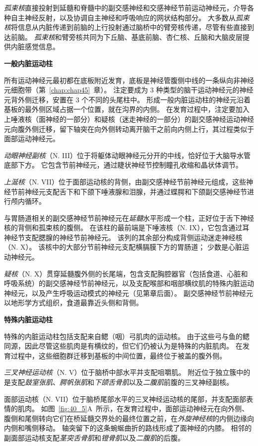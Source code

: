 \textit{孤束核}直接投射到延髓和脊髓中的副交感神经和交感神经节前运动神经元，介导各种自主神经反射，以及协调自主神经和呼吸响应的网状结构部分。
大多数从\textit{孤束核}将信息从内脏传递到前脑的上行投射通过脑桥中的臂旁核传递，尽管有些直接到达前脑。
\textit{孤束核}和臂旁核共同为下丘脑、基底前脑、杏仁核、丘脑和大脑皮层提供内脏感觉信息。


\textbf{一般内脏运动柱}

所有运动神经元最初都在底板附近发育，底板是神经管腹侧中线的一条纵向非神经元细胞带（第~\ref{chap:chap45}~章）。
注定要成为 3 种类型的脑干运动神经元的神经元背外侧迁移，安置在 3 个不同的头尾柱中。
形成一般内脏运动柱的神经元沿着基板的最外侧区域占据一个位置，就在沟界的内侧。
在发育过程中，注定要加入上唾液核（面神经的一部分）和疑核（迷走神经的一部分）的副交感神经运动神经元向腹外侧迁移，留下轴突在向外侧转动离开脑干之前向内侧上行，其过程类似于面部运动神经元。


\textit{动眼神经副核}（N. III）位于将躯体动眼神经元分开的中线，恰好位于大脑导水管底部下方。
它包含节前神经元，通过睫状神经节控制瞳孔收缩和晶状体调节。


\textit{上涎核}（N. VII）位于面部运动核的背侧，由副交感神经节前神经元组成，这些神经节前神经元支配舌下和下颌下唾液腺和泪腺，并通过蝶腭和下颌副交感神经节进行颅内循环。


与胃肠道相关的副交感神经节前神经元在\textit{延髓}水平形成一个柱，正好位于舌下神经核的背侧和孤束核的腹侧。
在该柱的最前端是下唾液核（N. IX），它包含通过耳神经节支配腮腺的神经节前神经元。
该列的其余部分构成背侧运动迷走神经核（N. X）。
该核中的大部分节前神经元支配横膈膜下方的胃肠道；
少数是心脏运动神经元。


\textit{疑核}（N. X）贯穿延髓腹外侧的长尾端，包含支配胸腔器官（包括食道、心脏和呼吸系统）的副交感神经节前神经元，以及支配喉部和咽部横纹肌的特殊内脏运动神经元，以及产生呼吸运动模式的神经元（见第章后面）。
副交感神经节前神经元以地形学方式组织，食道最靠近头侧和背侧。


\textbf{特殊内脏运动柱}

特殊的内脏运动柱包括支配来自鳃（咽）弓肌肉的运动核。
由于这些弓与鱼的鳃同源，因此尽管这些肌肉是有横纹的，但它们仍被认为是特殊的内脏肌肉。
在发育过程中，这些细胞群迁移到基板的中间位置，最终位于被盖的腹外侧。


\textit{三叉神经运动核}（N. V）位于脑桥中部水平并支配咀嚼肌。
附近位于独立簇中的是支配\textit{鼓室张肌}、\textit{腭帆张肌}和\textit{下颌舌骨肌}以及\textit{二腹肌}前腹的三叉神经副核。


面部运动核（N. VII）位于脑桥尾部水平的三叉神经运动核的尾部，并支配面部表情的肌肉。
如图~\ref{fig:40_5}A~所示，在发育过程中，面部运动神经元在向外侧、腹侧和尾侧转向它们在桥延髓交界处的最终位置之前，在\textit{外旋神经核}的内侧边缘向内侧和嘴侧移动。
轴突留下的这条蜿蜒曲折的路线形成了面神经的内膝。
相邻的副面部运动核支配\textit{茎突舌骨肌}和\textit{镫骨肌}以及\textit{二腹肌}的后腹。


